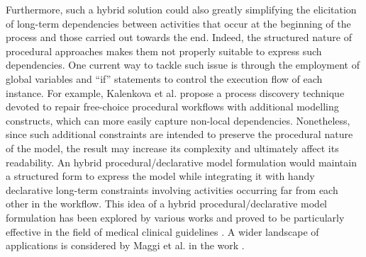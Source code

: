Furthermore, such a hybrid solution could also greatly simplifying the elicitation of long-term dependencies between activities that occur at the beginning of the process and those carried out towards the end. Indeed, the structured nature of procedural approaches makes them not properly suitable to express such dependencies.
One current way to tackle such issue is through the employment of global variables and ``if'' statements to control the execution flow of each instance. For example, Kalenkova et al. \cite{2020-Kalenkova} propose a process discovery technique devoted to repair free-choice procedural workflows with additional modelling constructs, which can more easily capture non-local dependencies. Nonetheless, since such additional constraints are intended to preserve the procedural nature of the model, the result may increase its complexity and ultimately affect its readability.
An hybrid procedural/declarative model formulation would maintain a structured form to express the model while integrating it with handy declarative long-term constraints involving activities occurring far from each other in the workflow.
%
%
This idea of a hybrid procedural/declarative model formulation has been explored by various works and proved to be particularly effective in the field of medical clinical guidelines \cite{2009a-Bottrighi,2009b-Bottrighi, 2011-Bottrighi}. A wider landscape of applications is considered by Maggi et al. in the work \cite{2018b-Maggi}. %



